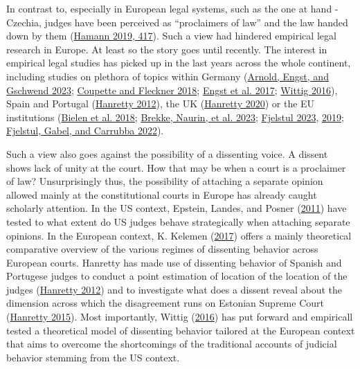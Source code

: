 \documentclass[
  11pt,
]{article}
\begin{document}
In contrast to, especially in European legal systems, such as the one at
hand - Czechia, judges have been perceived as ``proclaimers of law'' and
the law handed down by them
(\protect\hyperlink{ref-hamannGermanFederalCourts2019}{Hamann 2019,
417}). Such a view had hindered empirical legal research in Europe. At
least so the story goes until recently. The interest in empirical legal
studies has picked up in the last years across the whole continent,
including studies on plethora of topics within Germany
(\protect\hyperlink{ref-arnoldScalingCourtDecisions2023}{Arnold, Engst,
and Gschwend 2023};
\protect\hyperlink{ref-coupetteQuantitativeRechtswissenschaft2018}{Coupette
and Fleckner 2018};
\protect\hyperlink{ref-engstEinflussParteinaheAuf2017}{Engst et al.
2017};
\protect\hyperlink{ref-wittigOccurrenceSeparateOpinions2016}{Wittig
2016}), Spain and Portugal
(\protect\hyperlink{ref-hanrettyDissentIberiaIdeal2012}{Hanretty 2012}),
the UK
(\protect\hyperlink{ref-hanrettyCourtSpecialistsJudicial2020}{Hanretty
2020}) or the EU institutions
(\protect\hyperlink{ref-bielenBacklogsLitigationRates2018}{Bielen et al.
2018}; \protect\hyperlink{ref-brekkeThatOrderHow2023}{Brekke, Naurin, et
al. 2023}; \protect\hyperlink{ref-fjelstulHowChamberSystem2023}{Fjelstul
2023}, \protect\hyperlink{ref-fjelstulEvolutionEuropeanUnion2019}{2019};
\protect\hyperlink{ref-fjelstulTimelyAdministrationJustice2022}{Fjelstul,
Gabel, and Carrubba 2022}).

Such a view also goes against the possibility of a dissenting voice. A
dissent shows lack of unity at the court. How that may be when a court
is a proclaimer of law? Unsurprisingly thus, the possibility of
attaching a separate opinion allowed mainly at the constitutional courts
in Europe has already caught scholarly attention. In the US context,
Epstein, Landes, and Posner
(\protect\hyperlink{ref-epsteinWhyWhenJudges2011}{2011}) have tested to
what extent do US judges behave strategically when attaching separate
opinions. In the European context, K. Kelemen
(\protect\hyperlink{ref-kelemenJudicialDissentEuropean2017}{2017})
offers a mainly theoretical comparative overview of the various regimes
of dissenting behavior across European courts. Hanretty has made use of
dissenting behavior of Spanish and Portugese judges to conduct a point
estimation of location of the location of the judges
(\protect\hyperlink{ref-hanrettyDissentIberiaIdeal2012}{Hanretty 2012})
and to investigate what does a dissent reveal about the dimension across
which the disagreement runs on Estonian Supreme Court
(\protect\hyperlink{ref-hanrettyJudicialDisagreementNeed2015}{Hanretty
2015}). Most importantly, Wittig
(\protect\hyperlink{ref-wittigOccurrenceSeparateOpinions2016}{2016}) has
put forward and empiricall tested a theoretical model of dissenting
behavior tailored at the European context that aims to overcome the
shortcomings of the traditional accounts of judicial behavior stemming
from the US context.
\end{document}
